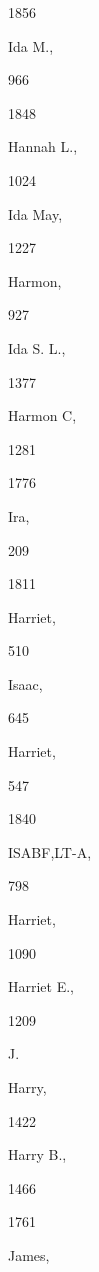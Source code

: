 \documentclass{book}
\begin{document}
{1856 


Ida M., 


966 


1848 


Hannah L., 


1024 




Ida May, 


1227 




Harmon, 


927 




Ida S. L., 


1377 




Harmon C, 


1281 


1776 


Ira, 


209 


1811 


Harriet, 


510 




Isaac, 


645 




Harriet, 


547 


1840 


ISABF,LT-A, 


798 




Harriet, 


1090 










Harriet E., 


1209 




J. 






Harry, 


1422 










Harry B., 


1466 


1761 


James, 


}
\end{document}
